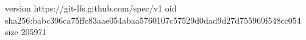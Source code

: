version https://git-lfs.github.com/spec/v1
oid sha256:babc396ca75ffc83aae054abaa5760107c57529d0dad9d27d755969f548cc054
size 205971
